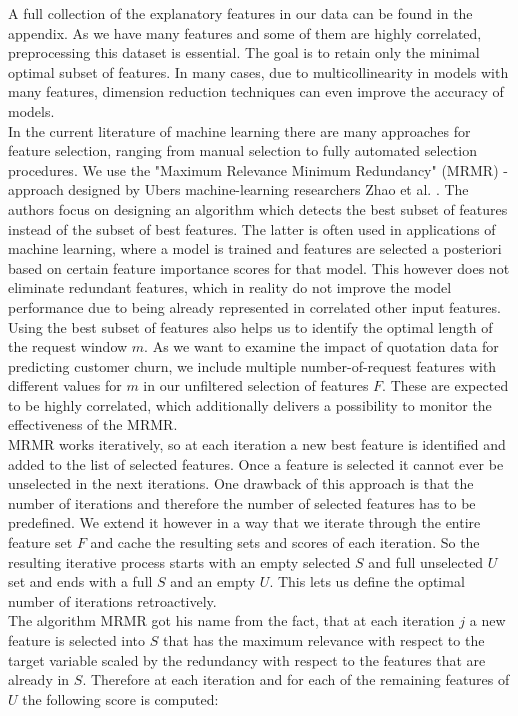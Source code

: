 \documentclass[12pt,titlepage]{article}
\begin{document}
A full collection of the explanatory features in our data can be found in the appendix. As we have many features and some of them are highly correlated, preprocessing this dataset is essential. The goal is to retain only the minimal optimal subset of features. In many cases, due to multicollinearity in models with many features, dimension reduction techniques can even improve the accuracy of models. \\
In the current literature of machine learning there are many approaches for feature selection, ranging from manual selection to fully automated selection procedures. We use the "Maximum Relevance Minimum Redundancy" (MRMR) - approach designed by Ubers machine-learning researchers Zhao et al. \cite{mrmr}. The authors focus on designing an algorithm which detects the best subset of features instead of the subset of best features. The latter is often used in applications of machine learning, where a model is trained and features are selected a posteriori based on certain feature importance scores for that model. This however does not eliminate redundant features, which in reality do not improve the model performance due to being already represented in correlated other input features. \\
Using the best subset of features also helps us to identify the optimal length of the request window $m$. As we want to examine the impact of quotation data for predicting customer churn, we include multiple number-of-request features with different values for $m$ in our unfiltered selection of features $F$. These are expected to be highly correlated, which additionally delivers a possibility to monitor the effectiveness of the MRMR. \\
MRMR works iteratively, so at each iteration a new best feature is identified and added to the list of selected features. Once a feature is selected it cannot ever be unselected in the next iterations. One drawback of this approach is that the number of iterations and therefore the number of selected features has to be predefined. We extend it however in a way that we iterate through the entire feature set $F$ and cache the resulting sets and scores of each iteration. So the resulting iterative process starts with an empty selected $S$ and full unselected $U$ set and ends with a full $S$ and an empty $U$. This lets us define the optimal number of iterations retroactively. \\
The algorithm MRMR got his name from the fact, that at each iteration $j$ a new feature is selected into $S$ that has the maximum relevance with respect to the target variable scaled by the redundancy with respect to the features that are already in $S$. Therefore at each iteration and for each of the remaining features of $U$ the following score is computed: \\
\end{document}

